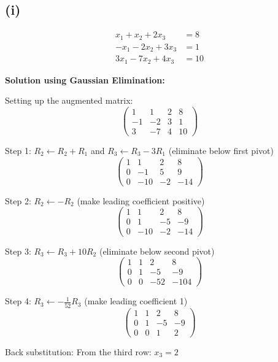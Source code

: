 \subsection*{(i)}
\begin{align*}
	x_1 + x_2 + 2x_3   & = 8  \\
	-x_1 - 2x_2 + 3x_3 & = 1  \\
	3x_1 - 7x_2 + 4x_3 & = 10
\end{align*}

\textbf{Solution using Gaussian Elimination:}

Setting up the augmented matrix:
\[
	\left(\begin{array}{ccc|c}
			1  & 1  & 2 & 8  \\
			-1 & -2 & 3 & 1  \\
			3  & -7 & 4 & 10
		\end{array}\right)
\]

Step 1: $R_2 \leftarrow R_2 + R_1$ and $R_3 \leftarrow R_3 - 3R_1$ (eliminate below first pivot)
\[
	\left(\begin{array}{ccc|c}
			1 & 1   & 2  & 8   \\
			0 & -1  & 5  & 9   \\
			0 & -10 & -2 & -14
		\end{array}\right)
\]

Step 2: $R_2 \leftarrow -R_2$ (make leading coefficient positive)
\[
	\left(\begin{array}{ccc|c}
			1 & 1   & 2  & 8   \\
			0 & 1   & -5 & -9  \\
			0 & -10 & -2 & -14
		\end{array}\right)
\]

Step 3: $R_3 \leftarrow R_3 + 10R_2$ (eliminate below second pivot)
\[
	\left(\begin{array}{ccc|c}
			1 & 1 & 2   & 8    \\
			0 & 1 & -5  & -9   \\
			0 & 0 & -52 & -104
		\end{array}\right)
\]

Step 4: $R_3 \leftarrow -\frac{1}{52}R_3$ (make leading coefficient 1)
\[
	\left(\begin{array}{ccc|c}
			1 & 1 & 2  & 8  \\
			0 & 1 & -5 & -9 \\
			0 & 0 & 1  & 2
		\end{array}\right)
\]

Back substitution:
From the third row: $x_3 = 2$

